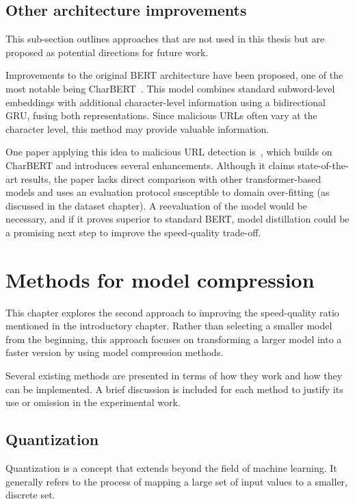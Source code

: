 \subsection{Other architecture improvements}
This sub-section outlines approaches that are not used in this thesis but are proposed as potential directions for future work.

Improvements to the original BERT architecture have been proposed, one of the most notable being CharBERT~\cite{charbert}. This model combines standard subword-level embeddings with additional character-level information using a bidirectional GRU, fusing both representations. Since malicious URLs often vary at the character level, this method may provide valuable information.

One paper applying this idea to malicious URL detection is~\cite{TransURL}, which builds on CharBERT and introduces several enhancements. Although it claims state-of-the-art results, the paper lacks direct comparison with other transformer-based models and uses an evaluation protocol susceptible to domain over-fitting (as discussed in the dataset chapter). A reevaluation of the model would be necessary, and if it proves superior to standard BERT, model distillation could be a promising next step to improve the speed-quality trade-off.

\section{Methods for model compression}
\label{sec:model_compression_methods}

This chapter explores the second approach to improving the speed-quality ratio mentioned in the introductory chapter. Rather than selecting a smaller model from the beginning, this approach focuses on transforming a larger model into a faster version by using model compression methods.

Several existing methods are presented in terms of how they work and how they can be implemented. A brief discussion is included for each method to justify its use or omission in the experimental work.

\subsection{Quantization}

Quantization is a concept that extends beyond the field of machine learning. It generally refers to the process of mapping a large set of input values to a smaller, discrete set.

